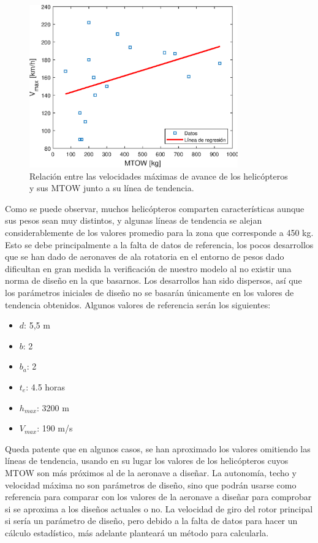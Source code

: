 \begin{figure}
	\centering
	\includegraphics[width=90mm]{graficos/analv}
	\caption{Relación entre las velocidades máximas de avance de los helicópteros y sus MTOW junto a su línea de tendencia.}
	\label{vAS}
\end{figure}

Como se puede observar, muchos helicópteros comparten características aunque sus pesos sean muy distintos, y algunas líneas de tendencia se alejan considerablemente de los valores promedio para la zona que corresponde a 450 kg. Esto se debe principalmente a la falta de datos de referencia, los pocos desarrollos que se han dado de aeronaves de ala rotatoria en el entorno de pesos dado dificultan en gran medida la verificación de nuestro modelo al no existir una norma de diseño en la que basarnos. Los desarrollos han sido dispersos, así que los parámetros iniciales de diseño no se basarán únicamente en los valores de tendencia obtenidos.
Algunos valores de referencia serán los siguientes:

\begin{itemize}
	\item $d$: 5,5 m
	\item $b$: 2
	\item $b_{a}$: 2
	\item $t_{e}$: 4.5 horas
	\item $h_{max}$: 3200 m
	\item $V_{max}$: 190 m/s
\end{itemize}

Queda patente que en algunos casos, se han aproximado los valores omitiendo las líneas de tendencia, usando en su lugar los valores de los helicópteros cuyos MTOW son más próximos al de la aeronave a diseñar.
La autonomía, techo y velocidad máxima no son parámetros de diseño, sino que podrán usarse como referencia para comparar con los valores de la aeronave a diseñar para comprobar si se aproxima a los diseños actuales o no.
La velocidad de giro del rotor principal si sería un parámetro de diseño, pero debido a la falta de datos para hacer un cálculo estadístico, más adelante planteará un método para calcularla.

